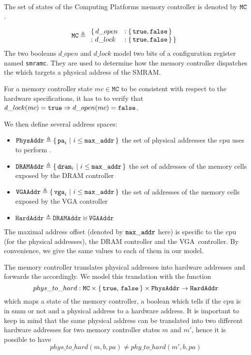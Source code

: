 The set of states of the  Computing Platforms memory
controller is denoted by $\mathtt{MC}$.

\[
  \texttt{MC} \triangleq
  \begin{array}{ll}
    \{\,d\_open &: \{\,\mathtt{true}, \mathtt{false}\,\} \\
    ;\,d\_lock &: \{\,\mathtt{true}, \mathtt{false}\,\}\,\}
  \end{array}
\]
%
The two booleans $d\_open$ and $d\_lock$ model two bits of a configuration
register named \texttt{smramc}.
%
They are used to determine how the memory controller dispatches the \IO which
targets a physical address of the SMRAM.

For a memory controller state $mc \in \texttt{MC}$ to be consistent with respect
to the hardware specifications, it has to to verify that
$d\_lock(mc) = \mathtt{true} \Rightarrow d\_open(mc) = \mathtt{false}$.

We then define several address spaces:
%
\begin{itemize}
\item $\texttt{PhysAddr} \triangleq \{\,\mathtt{pa}_i\ |\ i \leq \mathtt{max\_addr}\,\}$
  the set of physical addresses the \ac{cpu} uses to perform \IO.
%
\item
  $\texttt{DRAMAddr} \triangleq \{\,\mathtt{dram}_i\ |\ i \leq \mathtt{max\_addr}\,\}$
  the set of addresses of the memory cells exposed by the DRAM controller
%
\item $\texttt{VGAAddr} \triangleq \{\,\mathtt{vga}_i\ |\ i \leq \mathtt{max\_addr}\,\}$
  the set of addresses of the memory cells exposed by the VGA controller
%
\item $\texttt{HardAddr} \triangleq \texttt{DRAMAddr} \uplus \texttt{VGAAddr}$
\end{itemize}

The maximal address offset (denoted by $\mathtt{max\_addr}$ here) is specific to
the \ac{cpu} (for the physical addresses), the DRAM controller and the
VGA controller. By convenience, we give the same values to each of them in our
model.

The memory controller translates physical addresses into hardware addresses and
forwards the \IO accordingly.
%
We model this translation with the function
%
\[
  phys\_to\_hard : \texttt{MC} \times \{\,\mathtt{true},\,\mathtt{false}\,\}
  \times \texttt{PhysAddr} \rightarrow \texttt{HardAddr}
\]
%
which maps a state of the memory controller, a boolean which tells if the
\ac{cpu} is in \ac{smm} or not and a physical address to a hardware address.
%
It is important to keep in mind that the same physical address can be translated
into two different hardware addresses for two memory controller states $m$ and
$m'$, hence it is possible to have
%
\[
  phys\_to\_hard(m, b, pa) \neq phy\_to\_hard(m', b, pa)
\]


